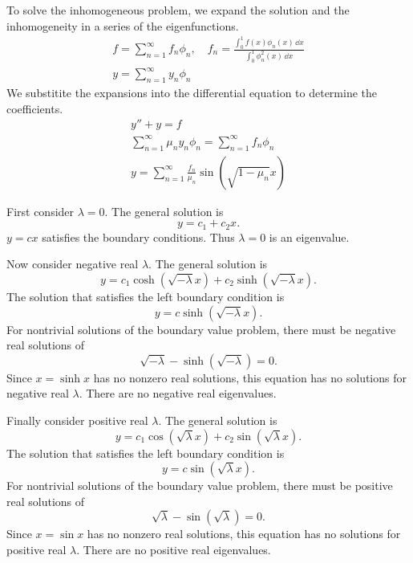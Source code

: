 {\begin{Solution}
  To solve the inhomogeneous problem, we expand the solution and the 
  inhomogeneity in a series of the eigenfunctions.
  \begin{gather*}
    f = \sum_{n=1}^\infty f_n \phi_n, \quad 
    f_n = \frac{ \int_0^1 f(x) \phi_n(x) \,\dd x }{ \int_0^1 \phi_n^2(x) \,\dd x }
    \\
    y = \sum_{n=1}^\infty y_n \phi_n
  \end{gather*}
  We substitite the expansions into the differential equation to determine
  the coefficients.
  \begin{gather*}
    y'' + y = f
    \\
    \sum_{n=1}^\infty \mu_n y_n \phi_n = \sum_{n=1}^\infty f_n \phi_n
    \\
    \boxed{
      y = \sum_{n=1}^\infty \frac{f_n}{\mu_n} \sin \left( \sqrt{1 - \mu_n} x \right)
      }
  \end{gather*}
\end{Solution}













\begin{Solution}
  \label{solution y''+ly=0 y'-y=0}
  First consider $\lambda = 0$.  The general solution is
  \[
  y = c_1 + c_2 x.
  \]
  $y = c x$ satisfies the boundary conditions.  Thus $\lambda = 0$ is an 
  eigenvalue.

  Now consider negative real $\lambda$.  The general solution is
  \[
  y = c_1 \cosh \left( \sqrt{-\lambda} x \right)
  + c_2 \sinh \left( \sqrt{-\lambda} x \right).
  \]
  The solution that satisfies the left boundary condition is
  \[
  y = c \sinh \left( \sqrt{-\lambda} x \right).
  \]
  For nontrivial solutions of the boundary value problem, there must be
  negative real solutions of 
  \[
  \sqrt{-\lambda} - \sinh \left( \sqrt{-\lambda} \right) = 0.
  \]
  Since $x = \sinh x$ has no nonzero real solutions, this equation has no 
  solutions for negative real $\lambda$.  There are no negative
  real eigenvalues.

  Finally consider positive real $\lambda$.  The general solution is
  \[
  y = c_1 \cos \left( \sqrt{\lambda} x \right)
  + c_2 \sin \left( \sqrt{\lambda} x \right).
  \]
  The solution that satisfies the left boundary condition is
  \[
  y = c \sin \left( \sqrt{\lambda} x \right).
  \]
  For nontrivial solutions of the boundary value problem, there must be
  positive real solutions of 
  \[
  \sqrt{\lambda} - \sin \left( \sqrt{\lambda} \right) = 0.
  \]
  Since $x = \sin x$ has no nonzero real solutions, this equation has no 
  solutions for positive real $\lambda$.  There are no positive
  real eigenvalues.


\end{Solution}}
